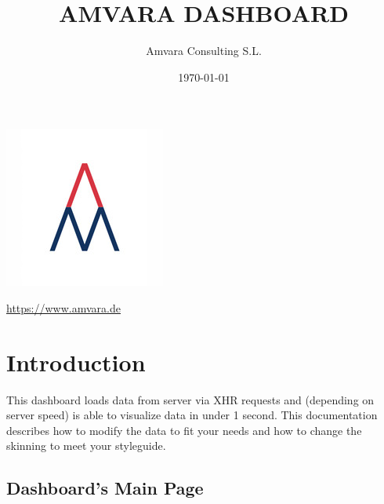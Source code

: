 \documentclass{article}
\title{AMVARA DASHBOARD}
\author{
        Amvara Consulting S.L.\\
}
\date{\today} %
\begin{document}
 
\maketitle %

\begin{centering} %
	\includegraphics{amvara} \par
	\url{https://www.amvara.de} \par
\end{centering}

\newpage %
\tableofcontents %
\newpage



\section{Introduction} %
This dashboard loads data from server via XHR requests and (depending on server speed) is able to visualize data in under 1 second. This documentation describes how to modify the data to fit your needs and how to change the skinning to meet your styleguide.

\subsection{Dashboard's Main Page}
\end{document}
